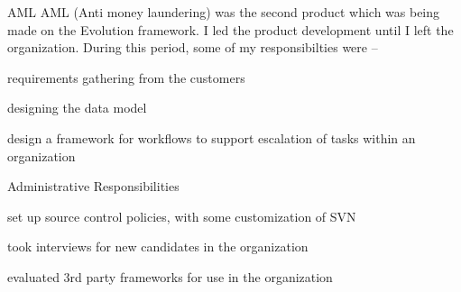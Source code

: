 \documentclass[a4paper,10pt,final]{article}
\newenvironment{resumedescription}{%
	\begin{basedescript}{\desclabelstyle{\nextlinelabel}\desclabelwidth{0.15\linewidth}}{%
		\renewcommand{\makelabel}[1]{\textsl{##1}}%
	}%
	}{%
	\end{basedescript}%
}
\begin{document}
\begin{resumedescription}
		\item[AML]
			AML (Anti money laundering) was the second product which was being made on the Evolution framework. I led the product development until I left the organization. During this period, some of my responsibilties were --
			\begin{itemize*}
				\item requirements gathering from the customers
				\item designing the data model
				\item design a framework for workflows to support escalation of tasks within an organization
			\end{itemize*}

		\item[Administrative Responsibilities]
			\begin{itemize*}
				\item set up source control policies, with some customization of SVN
				\item took interviews for new candidates in the organization
				\item evaluated 3rd party frameworks for use in the organization
			\end{itemize*}
	\end{resumedescription}
\end{document}
